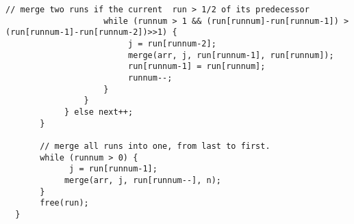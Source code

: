 \documentclass[AMA,STIX1COL]{WileyNJD-v2}
\begin{document}
\begin{lstlisting}[style=CStyle]
                    // merge two runs if the current  run > 1/2 of its predecessor                                                                                                         
                    while (runnum > 1 && (run[runnum]-run[runnum-1]) > (run[runnum-1]-run[runnum-2])>>1) {                                                                                                         
                         j = run[runnum-2];                                                                                                                                                       
                         merge(arr, j, run[runnum-1], run[runnum]);                                                                                                                             
                         run[runnum-1] = run[runnum];                                                                                                                                                  
                         runnum--;                                                                                                                                                                
                    }                                                                                                                                                                     
                }                                                                                                                                                                       
            } else next++;                                                                                                                                                               
       }                                                                                                                                                                           
                                                                                                                                                                                
       // merge all runs into one, from last to first.                                                                                                                             
       while (runnum > 0) { 
             j = run[runnum-1]; 
            merge(arr, j, run[runnum--], n); 
       }                                                                                                           
       free(run);                                                                                                                                                                  
  }                                                                                                                                                                                
\end{lstlisting}
\end{document}
